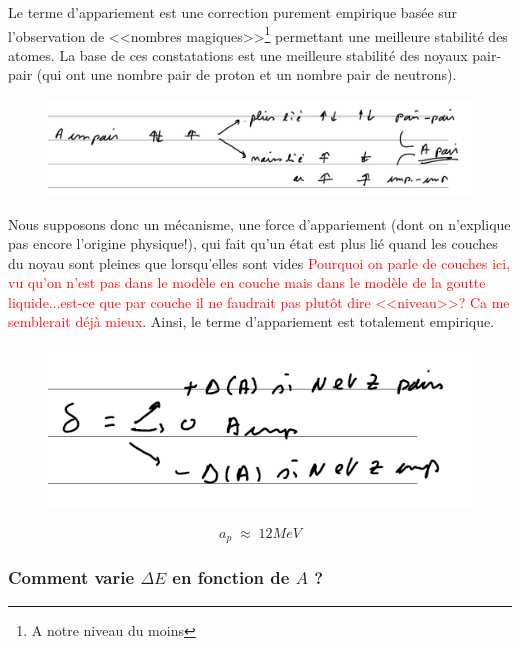 Le terme d'appariement est une correction purement empirique basée sur l'observation de <<nombres magiques>>\footnote{A notre niveau du moins} permettant une meilleure stabilité des atomes. La base de ces constatations est une meilleure stabilité des noyaux pair-pair (qui ont une nombre pair de proton et un nombre pair de neutrons).\\
\begin{figure}[ht]
    \centering
    \includegraphics[width=\textwidth]{Images4/appariement.PNG}
\end{figure}

Nous supposons donc un mécanisme, une force d'appariement (dont on n'explique pas encore l'origine physique!), qui fait qu'un état est plus lié quand les couches du noyau sont pleines que lorsqu'elles sont vides \textcolor{red}{Pourquoi on parle de couches ici, vu qu'on n'est pas dans le modèle en couche mais dans le modèle de la goutte liquide...est-ce que par couche il ne faudrait pas plutôt dire <<niveau>>? Ca me semblerait déjà mieux}. Ainsi, le terme d'appariement est totalement empirique.\\
\begin{figure}[htp]
    \centering
    \includegraphics{Images4/appariement2.PNG}
\end{figure}
\begin{equation*}
    a_p \; \approx \; 12MeV
\end{equation*}



\subsubsection{Comment varie $\Delta E$ en fonction de $A$ ?} 


